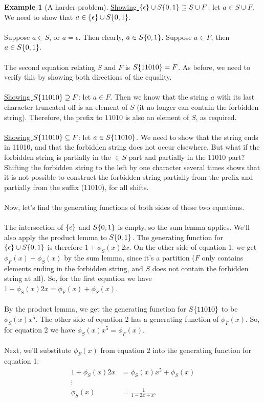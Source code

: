 \documentclass[]{article}
\theoremstyle{definition}
\newtheorem{ex}{Example}[section]
\newcommand{\lecture}[1]{\marginpar{{\footnotesize $\leftarrow$ \underline{#1}}}}
\DeclarePairedDelimiter{\set}{\lbrace}{\rbrace}
\begin{document}
\begin{ex}[A harder problem]
					\underline{Showing $\set{\epsilon } \cup S \set{0, 1 } \supseteq S \cup F$}: let $a \in S \cup F$. We need to show that $a \in \set{\epsilon } \cup S \set{0, 1 }$.
					\\ \\
					Suppose $a \in S$, or $a = \epsilon$. Then clearly, $a \in S \set{0, 1 }$. Suppose $a \in F$, then $a \in S \set{0, 1 }$.
					\\ \\
					The second equation relating $S$ and $F$ is $S\set{11010} = F$. As before, we need to verify this by showing both directions of the equality. \lecture{February 4, 2013}
					\\ \\
					\underline{Showing $S\set{11010} \supseteq F$}: let $a \in F$. Then we know that the string $a$ with its last character truncated off is an element of $S$ (it no longer can contain the forbidden string). Therefore, the prefix to $11010$ is also an element of $S$, as required.
					\\ \\
					\underline{Showing $S\set{11010} \subseteq F$}: let $a \in S\set{11010}$. We need to show that the string ends in 11010, and that the forbidden string does not occur elsewhere. But what if the forbidden string is partially in the $\in S$ part and partially in the 11010 part? Shifting the forbidden string to the left by one character several times shows that it is not possible to construct the forbidden string partially from the prefix and partially from the suffix (11010), for all shifts.
					\\ \\
					Now, let's find the generating functions of both sides of these two equations.
					\\ \\
					The intersection of $\set{\epsilon }$ and $S\set{0, 1}$ is empty, so the sum lemma applies. We'll also apply the product lemma to $S\set{0, 1 }$. The generating function for $\set{\epsilon } \cup S\set{0, 1}$ is therefore $1 + \phi_S(x) 2x$. On the other side of equation 1, we get $\phi_F(x) + \phi_S(x)$ by the sum lemma, since it's a partition ($F$ only contains elements ending in the forbidden string, and $S$ does not contain the forbidden string at all). So, for the first equation we have $1 + \phi_S(x) 2x = \phi_F(x) + \phi_S(x)$.
					\\ \\
					By the product lemma, we get the generating function for $S\set{11010}$ to be $\phi_S(x) x^5$. The other side of equation 2 has a generating function of $\phi_F(x)$. So, for equation 2 we have $\phi_S(x) x^5 = \phi_F(x)$.
					\\ \\
					Next, we'll substitute $\phi_F(x)$ from equation 2 into the generating function for equation 1:
					\begin{align*}
						1 + \phi_S(x) 2x &= \phi_S(x) x^5 + \phi_S(x) \\
						\vdots& \\
						\phi_S(x) &= \frac{1}{1 - 2x + x^5}
					\end{align*}
				\end{ex}
\end{document}
